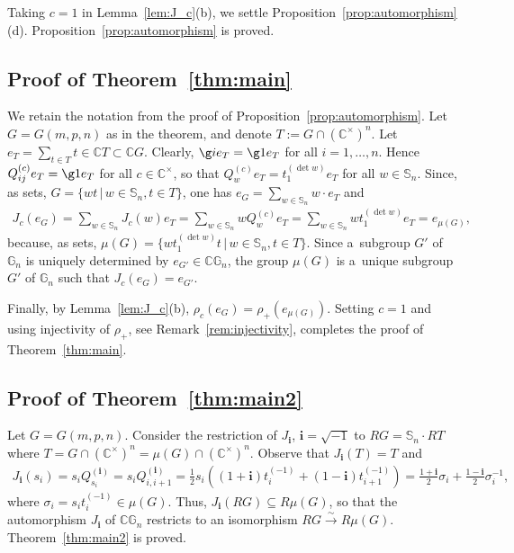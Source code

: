 Taking $c=1$ in Lemma~\ref{lem:J_c}(b), we settle Proposition~\ref{prop:automorphism}(d).
Proposition~\ref{prop:automorphism} is proved.


\subsection*{Proof of Theorem~\ref{thm:main}} We retain the notation from the proof of
Proposition~\ref{prop:automorphism}.
Let $G=G(m,p,n)$ as in the theorem, and denote $T:=G\cap (\mathbb C^\times)^n$.
Let $e_T=\sum\limits_{t\in T}t\in \mathbb C T\subset \mathbb C G$.
Clearly, $\g ie_T=\g 1e_T$ for all $i=1,\ldots,n$.
Hence $Q_{ij}^{(c)}e_T=\g1e_T$ for all $c\in\mathbb C^\times$, so that $Q_w^{(c)}e_T=t_1^{(\det w)}e_T$ for all $w\in
\mathbb S_n$.
Since, as sets, $G=\{wt \,|\, w\in \mathbb S_n, t\in T\}$, one has $e_G=\sum\limits_{w\in\mathbb S_n}w\cdot e_T$ and
\begin{gather*}
J_c(e_G)= \sum\limits_{w\in \mathbb S_n} J_c(w)e_T = \sum\limits_{w\in \mathbb S_n} wQ_w^{(c)}e_T =\sum\limits_{w\in
\mathbb S_n} wt_1^{(\det w)}e_T = e_{\mu(G)},
\end{gather*}
because, as sets, $\mu(G)=\big\{wt_1^{(\det w)} t \,|\, w\in \mathbb S_n, t\in T\big\}$.
Since a~subgroup $G'$ of $\mathbb G_n$ is uniquely determined by $e_{G'}\in\mathbb C \mathbb G_n$, the group $\mu(G)$ is
a~unique subgroup $G'$ of $\mathbb G_n$ such that $J_c(e_G)=e_{G'}$.

Finally, by Lemma~\ref{lem:J_c}(b), $\rho_c(e_G)=\rho_+(e_{\mu(G)})$.
Setting $c=1$ and using injectivity of $\rho_+$, see Remark~\ref{rem:injectivity}, completes the proof of
Theorem~\ref{thm:main}.


\subsection*{Proof of Theorem~\ref{thm:main2}} Let $G=G(m,p,n)$.
Consider the restriction of $J_\mathbf{i}$, $\mathbf{i}=\sqrt{-1}$ to $R G=\mathbb S_n\cdot R T$ where $T=G\cap (\mathbb
C^\times)^n=\mu(G)\cap (\mathbb C^\times)^n$.
Observe that $J_\mathbf{i}(T)=T$ and
\begin{gather*}
J_\mathbf{i}(s_i)=s_iQ_{s_i}^{(\mathbf{i})}=s_i Q_{i,i+1}^{(\mathbf{i})}
=\frac12 s_i\left((1+\mathbf{i})t_i^{(-1)}+(1-\mathbf{i})t_{i+1}^{(-1)}\right)
=\frac{1+\mathbf{i}}{2}\sigma_i+\frac{1-\mathbf{i}}{2}\sigma_i^{-1},
\end{gather*}
where $\sigma_i=s_i t_i^{(-1)}\in \mu(G)$.
Thus, $J_\mathbf{i}(R G)\subseteq R\mu(G)$, so that the automorphism $J_\mathbf{i}$ of $\mathbb C \mathbb G_n$ restricts
to an isomorphism $R G \xrightarrow{\sim} R \mu(G)$.
Theorem~\ref{thm:main2} is proved.
